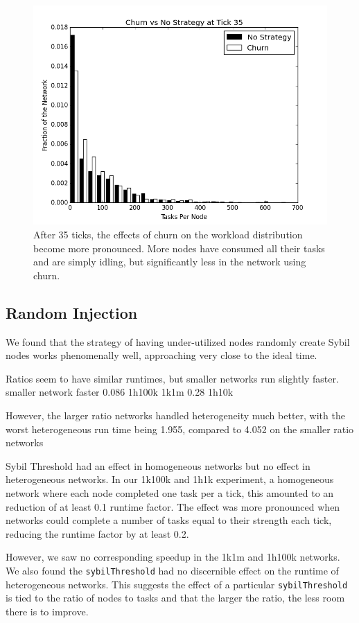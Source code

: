 \begin{figure}
	\centering
	\includegraphics[width=0.7\linewidth]{figs/churnStableHist35}
	\caption[Workload for churn at tick 35]{After 35 ticks, the effects of churn on the workload distribution become more pronounced.  More nodes have consumed all their tasks and are simply idling, but significantly less in the network using churn.}
	\label{fig:churnStableHist35}
\end{figure}

\subsection{Random Injection}

We found that the strategy of having under-utilized nodes randomly create Sybil nodes works phenomenally well, approaching very close to the ideal time.



Ratios seem to have similar runtimes, but smaller networks run slightly faster.
smaller network faster
0.086 1h100k 1k1m 
0.28 1h10k 


However, the larger ratio networks handled heterogeneity much better, with the worst heterogeneous run time being 1.955, compared to 4.052 on  the smaller ratio networks


Sybil Threshold had an effect in homogeneous networks but no effect in heterogeneous networks.
In our 1k100k and 1h1k experiment, a homogeneous network where each node completed one task per a tick, this amounted to an reduction of at least 0.1 runtime factor.
The effect was more pronounced when networks could complete a number of tasks equal to their strength each tick, reducing the runtime factor by at least 0.2.


However, we saw no corresponding speedup in the 1k1m and 1h100k networks.
We also found the \texttt{sybilThreshold} had no discernible effect on the runtime of heterogeneous networks.
This suggests the effect of a particular \texttt{sybilThreshold} is tied to the ratio of nodes to tasks and that the larger the ratio, the less room there is to improve.


